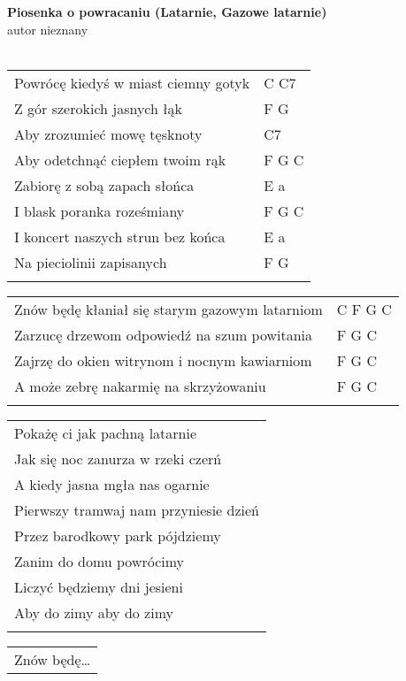 \documentclass[a5paper]{article}
\begin{document}


\noindent
\fontsize{12pt}{15pt}\selectfont
\textbf{Piosenka o powracaniu (Latarnie, Gazowe latarnie)} \\
\fontsize{8pt}{10pt}\selectfont
autor nieznany \\ \\
\fontsize{10pt}{12pt}\selectfont
{}
\begin{tabular}{@{}p{9.00cm}p{3cm}@{}}
\noindent
Powrócę kiedyś w miast ciemny gotyk & C C7 \\
Z gór szerokich jasnych łąk & F G \\
Aby zrozumieć mowę tęsknoty & C7 \\
Aby odetchnąć ciepłem twoim rąk & F G C \\
Zabiorę z sobą zapach słońca & E a \\
I blask poranka roześmiany & F G C \\
I koncert naszych strun bez końca & E a \\
Na pieciolinii zapisanych & F G \\ \\
\end{tabular}

\noindent
\begin{tabular}{@{}p{8.00cm}p{3cm}@{}}
Znów będę kłaniał się starym gazowym latarniom & C F G C \\
Zarzucę drzewom odpowiedź na szum powitania & F G C \\
Zajrzę do okien witrynom i nocnym kawiarniom & F G C \\
A może zebrę nakarmię na skrzyżowaniu & F G C \\ \\
\end{tabular}

\noindent
\begin{tabular}{@{}p{9.00cm}@{}}
Pokażę ci jak pachną latarnie \\
Jak się noc zanurza w rzeki czerń \\
A kiedy jasna mgła nas ogarnie \\
Pierwszy tramwaj nam przyniesie dzień \\
Przez barodkowy park pójdziemy \\
Zanim do domu powrócimy \\
Liczyć będziemy dni jesieni \\
Aby do zimy aby do zimy \\ \\
\end{tabular}

\noindent
\begin{tabular}{@{}p{8.00cm}@{}}
Znów będę…
\end{tabular}
\end{document}
